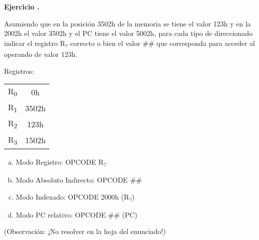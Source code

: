 \documentclass[12pt,a4paper]{article}
\newcounter{ctej}
\newcommand{\ejercicio}{\vspace{1em}\noindent\textbf{Ejercicio \arabic{ctej}.} \addtocounter{ctej}{1}}
\begin{document}



\ejercicio
Asumiendo que en la posición 3502h de la memoria se tiene el valor 123h y en la 2002h el valor 3502h y el PC tiene el valor 5002h, para cada tipo de direccionado indicar el registro R\textsubscript{\textquestiondown ?} correcto o bien el valor \#\# que corresponda para acceder al operando de valor 123h.\\[2mm]

\begin{minipage}{0.3\textwidth}
Registros:\\
\begin{tabular}{c|c|}\cline{2-2}
	R\textsubscript{0} & 0h \\\cline{2-2}
	R\textsubscript{1} & 3502h \\\cline{2-2}
	R\textsubscript{2} & 123h \\\cline{2-2}
	R\textsubscript{3} & 1502h \\\cline{2-2}
\end{tabular}
\end{minipage}
%
\begin{minipage}{0.6\textwidth}
\begin{enumerate}[a)]\itemsep0pt
\item Modo Registro:               OPCODE   R\textsubscript{\textquestiondown ?}
\item Modo Absoluto Indirecto:     OPCODE   \#\# 
\item Modo Indexado:               OPCODE   2000h (R\textsubscript{\textquestiondown ?}) 
\item Modo PC relativo:            OPCODE   \#\# (PC)
\end{enumerate}

\end{minipage}

\begin{center}
(Observación: ¡No resolver en la hoja del enunciado!)
\end{center}

\end{document}
